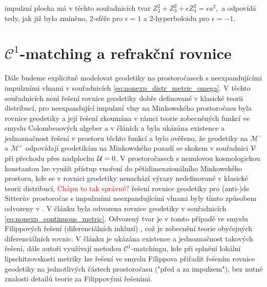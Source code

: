 impulzní plocha má v těchto souřadnicích tvar
$Z_2^2 + Z_3^2 + \epsilon Z_4^2 = \epsilon a^2,$
a odpovídá tedy, jak již bylo zmíněno, 2-sféře pro $\epsilon=1$ a 2-hyperboloidu pro $\epsilon=-1$.

\section{$\mathcal{C}^1$-matching a refrakční rovnice}
Dále budeme explicitně modelovat geodetiky na prostoročasech s neexpandujícími impulzními vlnami v souřadnicích
\eqref{eq:nonexp_distr_metric_omega}. V těchto souřadnicích není řešení rovnice geodetiky dobře definované v
klasické teorii distribucí, pro neexpandující impulzní vlny na Minkowského prostoročasu byla rovnice geodetiky
a její řešení zkoumána v rámci teorie zobecněných funkcí ve smyslu Colombeaových algeber a v článích \cite{Steinbauer_1998} a \cite{Kunzinger_1999}
byla ukázána existence a jednoznačnost řešení v prostoru těchto funkcí a bylo ověřeno, že geodetiky na $\mathcal{M}^-$ a $\mathcal{M}^+$ odpovídají
geodetikám na Minkowského pozadí se skokem v souřadnici $\mathcal{V}$ při přechodu přes nadplochu $\mathcal{U}=0$. V prostoročasech s
nenulovou kosmologickou konstantou lze využít přístup vnoření do pětidimenzionálního Minkowského prostoru, kde se v rovnici
geodetiky nenachází výrazy nedefinované v klasické teorii distribucí, \textcolor{red}{Chápu to tak správně?} řešení rovnice geodetiky
pro (anti-)de Sitterův prostoročas s impulzními neexpandujícími vlnami byly tímto způsobem odvozeny v \cite{Podolsk__2001}.
V článku \cite{Podolsky:2014ysa} byla odvozena rovnice geodetiky v souřadnicích \eqref{eq:nonexp_continuous_metric}.
Odvozený tvar je v tomto případě ve smyslu Filippových řešení (diferenciálních inkluzí) \cite{filippov1988differential}, což je zobecnění teorie obyčejných diferenciálních rovnic.
V článku je ukázána existence a jednoznačnost takových řešení, dále autoři využívají metodou $\mathcal{C}^1$-matchingu,
kde při splnění lokální lipschitzovskosti metriky lze řešení ve smyslu Filippova přiřadit řešením rovnice geodetiky na jednotlivých částech prostoročasu
("před a za impulzem"), bez nutné znalosti detailů teorie za Filippovými řešeními.


